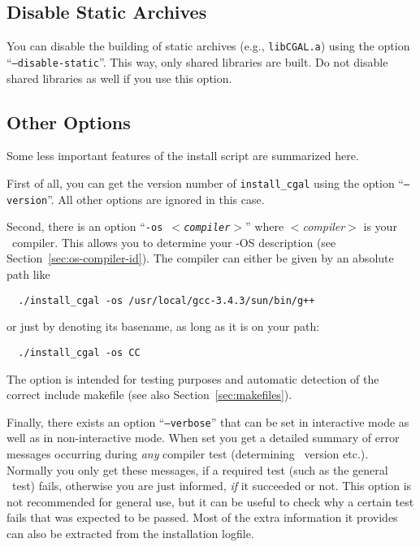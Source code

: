 \subsection{Disable Static Archives\label{sec:disable-static-setup}}

You can disable the building of static archives (e.g.,
\texttt{libCGAL.a}) using the option
\mbox{``\texttt{--disable-static}''}. This
way, only shared libraries are built. Do not disable shared libraries as
well if you use this option.

\subsection{Other Options\label{sec:other-options}}

Some less important features of the install script are summarized
here.

First of all, you can get the version number of \texttt{install\_cgal}
using the option ``\texttt{--version}''. All other options are ignored
in this case.

Second, there is an option ``\texttt{-os \textit{$<$compiler$>$}}''
where \textit{$<$compiler$>$} is your \CC\ compiler. This allows you
to determine your \cgal-OS description (see
Section~\ref{sec:os-compiler-id}). The compiler can either be given by
an absolute path like
\begin{verbatim}
  ./install_cgal -os /usr/local/gcc-3.4.3/sun/bin/g++
\end{verbatim}
or just by denoting its basename, as long as it is on your path:
\begin{verbatim}
  ./install_cgal -os CC
\end{verbatim}
The option is intended for testing purposes and automatic detection of
the correct include makefile (see also Section~\ref{sec:makefiles}).

Finally, there exists an option
``\texttt{--verbose}'' that
can be set in interactive mode as well as in non-interactive mode.
When set you get a detailed summary of error messages occurring during
\textit{any} compiler test (determining \stl\ version etc.). Normally
you only get these messages, if a required test (such as the general
\stl\ test) fails, otherwise you are just informed, \textit{if} it
succeeded or not. This option is not recommended for general use, but
it can be useful to check why a certain test fails that was expected
to be passed. Most of the extra information it provides can also be
extracted from the installation logfile.

